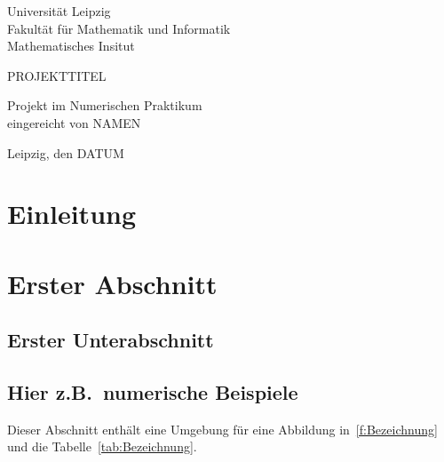 \documentclass[a4paper,12pt]{article}
\theoremstyle{definition}
\begin{document}
\begin{titlepage}\parindent0cm
Universit\"at Leipzig\\
Fakult\"at f\"ur Mathematik und Informatik\\
Mathematisches Insitut\\

\vspace{5cm}


\begin{center}
\huge{PROJEKTTITEL}

\vspace{1cm}
\Large{Projekt im Numerischen Praktikum}\\
\vspace{0.5cm}
\large{eingereicht von NAMEN}
\end{center}

\vfill
\begin{minipage}{\textwidth}
Leipzig, den DATUM
\end{minipage}
\end{titlepage}





\tableofcontents


\newpage


\section{Einleitung}


\section{Erster Abschnitt} 

\subsection{Erster Unterabschnitt}


\subsection{Hier z.B.\ numerische Beispiele}

Dieser Abschnitt enth\"alt eine Umgebung f\"ur eine Abbildung 
in~\ref{f:Bezeichnung} und die Tabelle~\ref{tab:Bezeichnung}.
\end{document}
